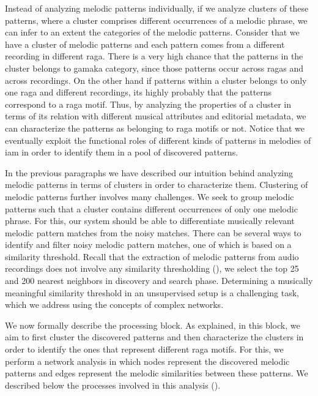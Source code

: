 Instead of analyzing melodic patterns individually, if we analyze clusters of these patterns, where a cluster comprises different occurrences of a melodic phrase, we can infer to an extent the categories of the melodic patterns. Consider that we have a cluster of melodic patterns and each pattern comes from a different recording in different \gls{raga}. There is a very high chance that the patterns in the cluster belongs to \gls{gamaka} category, since those patterns occur across \glspl{raga} and across recordings. On the other hand if patterns within a cluster belongs to only one \gls{raga} and different recordings, its highly probably that the patterns correspond to a \gls{raga} motif. Thus, by analyzing the properties of a cluster in terms of its relation with different musical attributes and editorial metadata, we can characterize the patterns as belonging to \gls{raga} motifs or not. Notice that we eventually exploit the functional roles of different kinds of patterns in melodies of \gls{iam} in order to identify them in a pool of discovered patterns. 

In the previous paragraphs we have described our intuition behind analyzing melodic patterns in terms of clusters in order to characterize them. Clustering of melodic patterns further involves many challenges. We seek to group melodic patterns such that a cluster contains different occurrences of only one melodic phrase. For this, our system should be able to differentiate musically relevant melodic pattern matches from the noisy matches. There can be several ways to identify and filter noisy melodic pattern matches, one of which is based on a similarity threshold. Recall that the extraction of melodic patterns from audio recordings does not involve any similarity thresholding (), we select the top 25 and 200 nearest neighbors in discovery and search phase. Determining a musically meaningful similarity threshold in an unsupervised setup is a challenging task, which we address using the concepts of complex networks. 
 
We now formally describe the processing block. As explained, in this block, we aim to first cluster the discovered patterns and then characterize the clusters in order to identify the ones that represent different \gls{raga} motifs. For this, we perform a network analysis in which nodes represent the discovered melodic patterns and edges represent the melodic similarities between these patterns. We described below the processes involved in this analysis (). 



